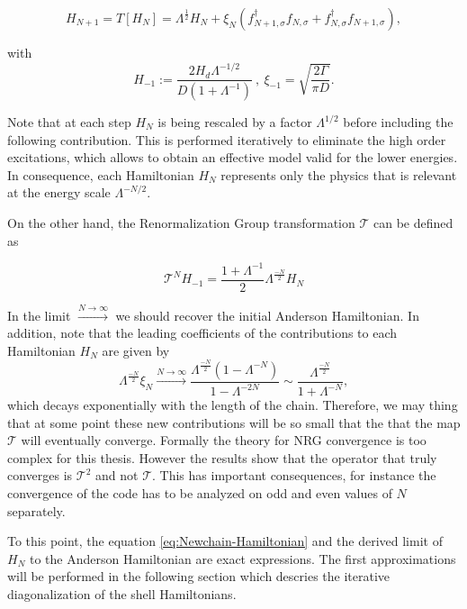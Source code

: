 \begin{equation}
H_{N+1}=T\left[H_{N}\right]=\Lambda^{\frac{1}{2}}H_{N}+\xi_{N}\left(f_{N+1,\sigma}^{\dagger}f_{N,\sigma}+f_{N,\sigma}^{\dagger}f_{N+1,\sigma}\right), \label{eq:NRG-Renormalization}
\end{equation}

\noindent with 
\begin{equation}
H_{-1} := \frac{2 H_d\Lambda^{-1/2}}{D(1+\Lambda^{-1})}\ ,\ \xi_{-1}=\sqrt{\frac{2\Gamma}{\pi D}}.\label{eq:H-1}
\end{equation}

Note that at each step  $H_N$ is being rescaled by a factor $\Lambda^{1/2}$ before including the following contribution.  This is performed iteratively to eliminate the high order excitations, which allows to obtain an effective model valid for the lower energies. In consequence, each Hamiltonian $H_N$ represents only the physics that is relevant at the energy scale $\Lambda^{-N/2}$. 

On the other hand, the Renormalization Group transformation $\mathcal{T}$ can be defined as 

$$\mathcal{T}^N H_{-1} =  \frac{1+\Lambda^{-1}}{2}\Lambda^\frac{ -N }{2} H_N$$

\noindent In the limit $\xrightarrow{N\rightarrow\infty}$ we should recover the initial Anderson Hamiltonian. In addition, note that the leading coefficients of the contributions to each Hamiltonian $H_N$ are given by 
\[
\Lambda^{\frac{-N}{2}}\xi_{N}\xrightarrow{N\rightarrow\infty}\frac{\Lambda^{\frac{-N}{2}}\left(1-\Lambda^{-N}\right)}{1-\Lambda^{-2N}}\sim\frac{\Lambda^{\frac{-N}{2}}}{1+\Lambda^{-N}},
\]
\noindent which decays exponentially with the length of the chain. Therefore, we may thing that at some point these new contributions will be so small that the that the map $\mathcal{T}$ will eventually converge. Formally the theory for NRG convergence is too complex for this thesis. However the results show that the operator that truly converges is $\mathcal{T}^2$ and not $\mathcal{T}$\cite{krishna-murthy_renormalization-group_1980}. This has important consequences, for instance the convergence of the code has to be analyzed on odd and even values of $N$ separately. 

To this point, the equation \eqref{eq:Newchain-Hamiltonian} and the derived limit of $H_N$ to the Anderson Hamiltonian are exact expressions. The first approximations will be performed in the following section which descries the iterative diagonalization of the shell Hamiltonians.
 
